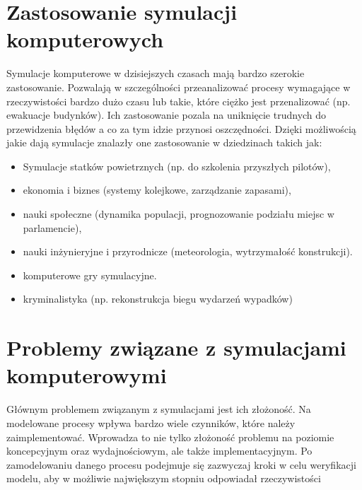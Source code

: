 \section{Zastosowanie symulacji komputerowych}
\label{sec:ZastosowanieSymulacji}

Symulacje komputerowe w dzisiejszych czasach mają bardzo szerokie zastosowanie. Pozwalają w szczególności przeanalizować procesy wymagające w rzeczywistości bardzo dużo czasu lub takie, które ciężko jest przenalizować (np. ewakuacje budynków). Ich zastosowanie pozala na uniknięcie trudnych do przewidzenia błędów a co za tym idzie przynosi oszczędności. Dzięki możliwością jakie dają symulacje znalazły one zastosowanie w dziedzinach takich jak:

\begin{itemize}
\item Symulacje statków powietrznych (np. do szkolenia przyszłych pilotów),
\item ekonomia i biznes (systemy kolejkowe, zarządzanie zapasami),
\item nauki społeczne (dynamika populacji, prognozowanie podziału miejsc w parlamencie),
\item nauki inżynieryjne i przyrodnicze (meteorologia, wytrzymałość konstrukcji).
\item komputerowe gry symulacyjne.
\item kryminalistyka (np. rekonstrukcja biegu wydarzeń wypadków)
\end{itemize}

\section{Problemy związane z symulacjami komputerowymi}
\label{sec:ProblemyzSymulacjami}

Głównym problemem związanym z symulacjami jest ich złożoność. Na modelowane procesy wpływa bardzo wiele czynników, które należy zaimplementować. Wprowadza to nie tylko złożoność problemu na poziomie koncepcyjnym oraz wydajnościowym, ale także implementacyjnym. Po zamodelowaniu danego procesu podejmuje się zazwyczaj kroki w celu weryfikacji modelu, aby w możliwie największym stopniu odpowiadał rzeczywistości
















